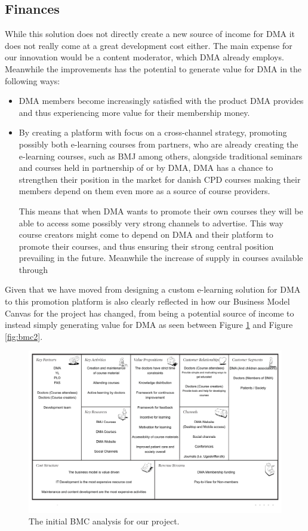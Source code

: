 \subsection{Finances}
While this solution does not directly create a new source of income for DMA it does not really come at a great development cost either. The main expense for our innovation would be a content moderator, which DMA already employs. Meanwhile the improvements has the potential to generate value for DMA in the following ways:

\begin{itemize}
\item DMA members become increasingly satisfied with the product DMA provides and thus experiencing more value for their membership money.
\item By creating a platform with focus on a cross-channel strategy, promoting possibly both e-learning courses from partners, who are already creating the e-learning courses, such as BMJ among others, alongside traditional seminars and courses held in partnership of or by DMA, DMA has a chance to strengthen their position in the market for danish CPD courses making their members depend on them even more as a source of course providers.

This means that when DMA wants to promote their own courses they will be able to access some possibly very strong channels to advertise. This way course creators might come to depend on DMA and their platform to promote their courses, and thus ensuring their strong central position prevailing in the future. Meanwhile the increase of supply in courses available through
\end{itemize}

Given that we have moved from designing a custom e-learning solution for DMA to this promotion platform is also clearly reflected in how our Business Model Canvas for the project has changed, from being a potential source of income to instead simply generating value for DMA as seen between Figure \ref{fig:bmc1} and Figure \ref{fig:bmc2}.


\begin{figure}[h!]
 \begin{center}
  \includegraphics[width=1\textwidth]{figures/Business-Model-Canvas-v1.pdf}
  \caption{The initial BMC analysis for our project.\label{fig:bmc1}}
 \end{center}
\end{figure}

